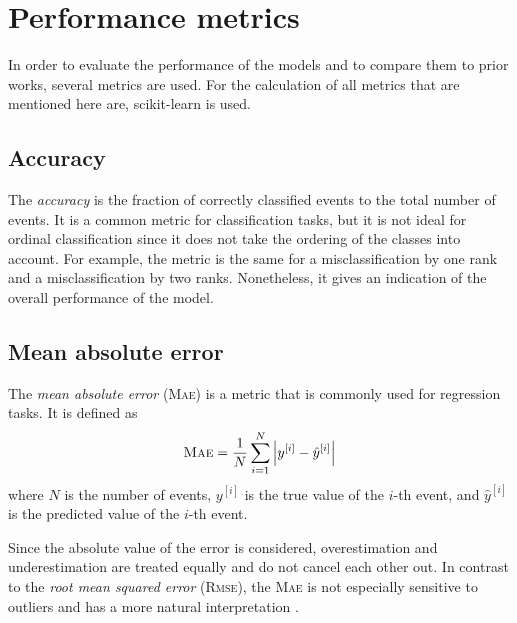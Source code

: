 \section{Performance metrics}
In order to evaluate the performance of the models
and to compare them to prior works,
several metrics are used.
%
For the calculation of all metrics that are mentioned here are,
scikit-learn \cite{sklearn} is used.
%


\subsection{Accuracy}
The \emph{accuracy} \cite{accuracy} is the fraction of correctly classified events to the total number of events.
It is a common metric for classification tasks,
but it is not ideal for ordinal classification
  since it does not take the ordering of the classes into account.
For example,
the metric is the same for
a misclassification by one rank
and a misclassification by two ranks.
%
Nonetheless,
it gives an indication of the overall performance of the model.


\subsection{Mean absolute error}
The \emph{mean absolute error} (\textsc{Mae}) \cite{mae} is a metric that is commonly used for regression tasks. %
It is defined as
\begin{equation}
  \text{\textsc{Mae}} = \frac{1}{N} \sum_{i=1}^N \left| y^{[i]} - \hat{y}^{[i]} \right|
\end{equation}
where $N$ is the number of events,
$y^{[i]}$ is the true value of the $i$-th event,
and $\hat{y}^{[i]}$ is the predicted value of the $i$-th event. %


Since the absolute value of the error is considered,
overestimation and underestimation are treated equally
and do not cancel each other out.
In contrast to the \emph{root mean squared error} (\textsc{Rmse}),
the \textsc{Mae} is not especially sensitive to outliers
and has a more natural interpretation \cite{mae}.


